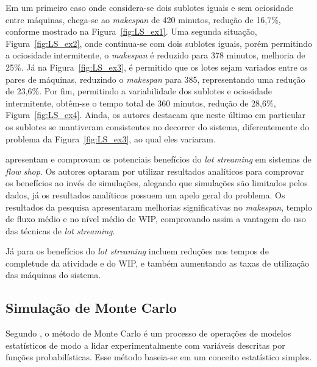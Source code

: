         Em um primeiro caso onde considera-se dois sublotes iguais e sem ociosidade entre máquinas, chega-se ao \textit{makespan} de 420 minutos, redução de 16,7\%, conforme mostrado na Figura~\ref{fig:LS_ex1}. Uma segunda situação, Figura~\ref{fig:LS_ex2}, onde continua-se com dois sublotes iguais, porém permitindo a ociosidade intermitente, o \textit{makespan} é reduzido para 378 minutos, melhoria de 25\%. Já na Figura~\ref{fig:LS_ex3}, é permitido que os lotes sejam variados entre os pares de máquinas, reduzindo o \textit{makespan} para 385, representando uma redução de 23,6\%. Por fim, permitindo a variabilidade dos sublotes e ociosidade intermitente, obtêm-se o tempo total de 360 minutos, redução de 28,6\%, Figura~\ref{fig:LS_ex4}. Ainda, os autores destacam que neste último em particular os sublotes se mantiveram consistentes no decorrer do sistema, diferentemente do problema da Figura~\ref{fig:LS_ex3}, ao qual eles variaram.
        
         apresentam e comprovam os potenciais benefícios do \textit{lot streaming} em sistemas de \textit{flow shop}. Os autores optaram por utilizar resultados analíticos para comprovar os benefícios ao invés de simulações, alegando que simulações são limitados pelos dados, já os resultados analíticos possuem um apelo geral do problema. Os resultados da pesquisa apresentaram melhorias significativas no \textit{makespan}, templo de fluxo médio e no nível médio de WIP, comprovando assim a vantagem do uso das técnicas de \textit{lot streaming}.
        
        Já para  os benefícios do \textit{lot streaming} incluem reduções nos tempos de completude da atividade e do WIP, e também aumentando as taxas de utilização das máquinas do sistema.
        
        

        

        

        
        

    \subsection{Simulação de Monte Carlo}
    Segundo , o método de Monte Carlo é um processo de operações de modelos estatísticos de modo a lidar experimentalmente com variáveis descritas por funções probabilísticas. Esse método baseia-se em um conceito estatístico simples.

